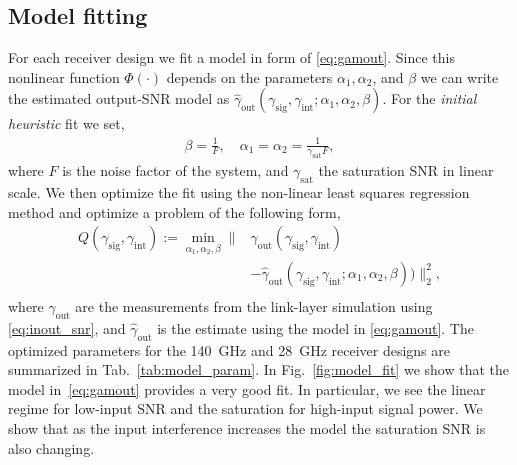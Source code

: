 \subsection{Model fitting}
For each receiver design we fit a model in form of
\eqref{eq:gamout}. Since this nonlinear function 
$\Phi(\cdot)$ depends on the parameters $\alpha_1,\alpha_2$, and
$\beta$ we can write the estimated output-SNR model as $\hat{\gamma}_\mathrm{out}(\gamma_\mathrm{sig}, \gamma_\mathrm{int}; \alpha_1, \alpha_2, \beta)$. For the \emph{initial 
heuristic} fit we set, 
\begin{align}
    \beta = \frac{1}{F}, \quad \alpha_1 = \alpha_2 = \frac{1}{\gamma_\mathrm{sat}F},
    \label{eq:fitinit}
\end{align}
where $F$ is the noise factor of the system, and $\gamma_\mathrm{sat}$
the saturation SNR in linear scale. %
We then  optimize the fit  using the non-linear least squares regression method and optimize a problem of the following form,
\begin{align}
   Q(\gamma_\mathrm{sig}, \gamma_\mathrm{int}) := \min_{\alpha_1, \alpha_2, \beta}\|& \gamma_\mathrm{out}(\gamma_\mathrm{sig}, \gamma_\mathrm{int}) \nonumber \\ &
    - \hat{\gamma}_\mathrm{out}(\gamma_\mathrm{sig}, \gamma_\mathrm{int}; \alpha_1, \alpha_2, \beta)) \|_2^2, \nonumber\\
\end{align}
where  $\gamma_\mathrm{out}$ are the measurements from the link-layer simulation using \eqref{eq:inout_snr}, and $\hat{\gamma}_\mathrm{out}$ is the estimate using the model in
\eqref{eq:gamout}. The optimized parameters for the \SI{140}{GHz} and \SI{28}{GHz} receiver
designs are summarized in Tab.~\ref{tab:model_param}. In Fig.~\ref{fig:model_fit} we show that the model in~\eqref{eq:gamout} provides a very good fit. In particular, we see the linear regime for low-input SNR and the saturation for high-input signal power. We show that as the input interference increases the model the saturation SNR is also changing.

